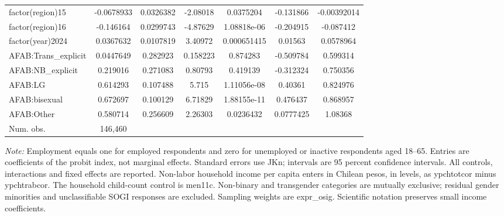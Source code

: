 \begin{landscape}
\begin{longtable}{l c c c c c c}
factor(region)15 & -0.0678933 & 0.0326382 & -2.08018 & 0.0375204 & -0.131866 & -0.00392014 \\
factor(region)16 & -0.146164 & 0.0299743 & -4.87629 & 1.08818e-06 & -0.204915 & -0.087412 \\
factor(year)2024 & 0.0367632 & 0.0107819 & 3.40972 & 0.000651415 & 0.01563 & 0.0578964 \\
AFAB:Trans\_explicit & 0.0447649 & 0.282923 & 0.158223 & 0.874283 & -0.509784 & 0.599314 \\
AFAB:NB\_explicit & 0.219016 & 0.271083 & 0.80793 & 0.419139 & -0.312324 & 0.750356 \\
AFAB:LG & 0.614293 & 0.107488 &   5.715 & 1.11056e-08 & 0.40361 & 0.824976 \\
AFAB:bisexual & 0.672697 & 0.100129 & 6.71829 & 1.88155e-11 & 0.476437 & 0.868957 \\
AFAB:Other & 0.580714 & 0.256609 & 2.26303 & 0.0236432 & 0.0777425 & 1.08368 \\
\hline
Num. obs. & 146,460 & & & & & \\
\end{longtable}
\par\noindent\textit{Note:} Employment equals one for employed respondents and zero for unemployed or inactive respondents aged 18--65. Entries are coefficients of the probit index, not marginal effects. Standard errors use JKn; intervals are 95 percent confidence intervals. All controls, interactions and fixed effects are reported. Non-labor household income per capita enters in Chilean pesos, in levels, as ypchtotcor minus ypchtrabcor. The household child-count control is men11c. Non-binary and transgender categories are mutually exclusive; residual gender minorities and unclassifiable SOGI responses are excluded. Sampling weights are expr\_osig. Scientific notation preserves small income coefficients.
\endgroup
\end{landscape}
